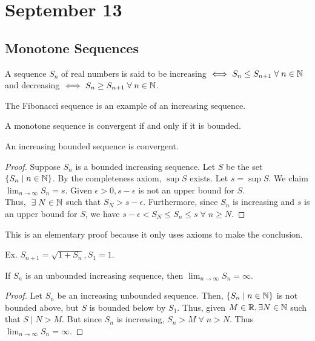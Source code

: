 \section{September 13}

\subsection{Monotone Sequences}
\begin{definition}
    A sequence $S_n$ of real numbers is said to be increasing $\iff S_n \leq S_{n+1} \;\forall\; n \in \mathbb{N}$ and decreasing $\iff S_n \geq S_{n+1} \;\forall\; n \in \mathbb{N}$.
\end{definition}
The Fibonacci sequence is an example of an increasing sequence.

\begin{definition}
    A monotone sequence is convergent if and only if it is bounded.
\end{definition}

\begin{theorem}
    An increasing bounded sequence is convergent.
\end{theorem}
\begin{proof}
    Suppose $S_n$ is a bounded increasing sequence. Let $S$ be the set $\{S_n \mid n \in \mathbb{N}\}$. By the completeness axiom, $\sup S$ exists. Let $s = \sup S$. We claim $\lim_{n \to \infty} S_n = s$. Given $\epsilon > 0, s - \epsilon$ is not an upper bound for $S$. \\ Thus, $\;\exists\; N \in \mathbb{N}$ such that $S_N > s - \epsilon$. Furthermore, since $S_n$ is increasing and $s$ is an upper bound for $S$, we have $s - \epsilon < S_N \leq S_n \leq s \;\forall\; n \geq N$.
\end{proof}
\begin{remark}
    This is an elementary proof because it only uses axioms to make the conclusion.
\end{remark}
Ex. $S_{n+1} = \sqrt{1 + S_n}, S_1 = 1$.


\begin{theorem}
    If $S_n$ is an unbounded increasing sequence, then $\lim_{n \to \infty} S_n = \infty$.
\end{theorem}
\begin{proof}
    Let $S_n$ be an increasing unbounded sequence. Then, $\{S_n \mid n \in \mathbb{N}\}$ is not bounded above, but $S$ is bounded below by $S_1$. Thus, given $M \in \mathbb{R}, \exists N \in \mathbb{N}$ such that $S \mid N > M$. But since $S_n$ is increasing, $S_n > M \;\forall\; n > N$. Thus $\lim_{n \to \infty} S_n = \infty$.
\end{proof}